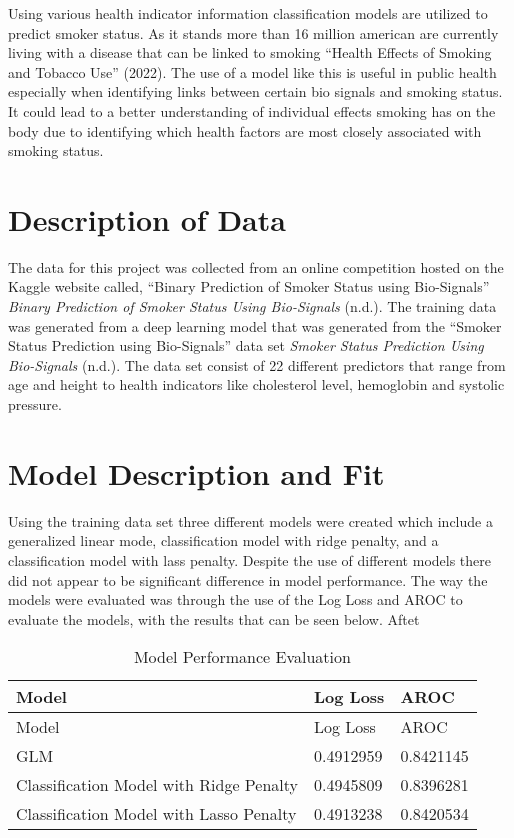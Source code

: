\documentclass[
  12pt,
  letterpaper,
]{article}
\begin{document}
Using various health indicator information classification models are
utilized to predict smoker status. As it stands more than 16 million
american are currently living with a disease that can be linked to
smoking {``Health {Effects} of {Smoking} and {Tobacco} {Use}''} (2022).
The use of a model like this is useful in public health especially when
identifying links between certain bio signals and smoking status. It
could lead to a better understanding of individual effects smoking has
on the body due to identifying which health factors are most closely
associated with smoking status.

\hypertarget{description-of-data}{%
\section{Description of Data}\label{description-of-data}}

The data for this project was collected from an online competition
hosted on the Kaggle website called, ``Binary Prediction of Smoker
Status using Bio-Signals'' \emph{Binary {Prediction} of {Smoker}
{Status} Using {Bio}-{Signals}} (n.d.). The training data was generated
from a deep learning model that was generated from the ``Smoker Status
Prediction using Bio-Signals'' data set \emph{Smoker {Status}
{Prediction} Using {Bio}-{Signals}} (n.d.). The data set consist of 22
different predictors that range from age and height to health indicators
like cholesterol level, hemoglobin and systolic pressure.

\hypertarget{model-description-and-fit}{%
\section{Model Description and Fit}\label{model-description-and-fit}}

Using the training data set three different models were created which
include a generalized linear mode, classification model with ridge
penalty, and a classification model with lass penalty. Despite the use
of different models there did not appear to be significant difference in
model performance. The way the models were evaluated was through the use
of the Log Loss and AROC to evaluate the models, with the results that
can be seen below. Aftet

\begin{longtable}[]{@{}lll@{}}
\caption{Model Performance Evaluation}\tabularnewline
\toprule\noalign{}
Model & Log Loss & AROC \\
\midrule\noalign{}
\endfirsthead
\toprule\noalign{}
Model & Log Loss & AROC \\
\midrule\noalign{}
\endhead
\bottomrule\noalign{}
\endlastfoot
GLM & 0.4912959 & 0.8421145 \\
Classification Model with Ridge Penalty & 0.4945809 & 0.8396281 \\
Classification Model with Lasso Penalty & 0.4913238 & 0.8420534 \\
\end{longtable}
\end{document}
